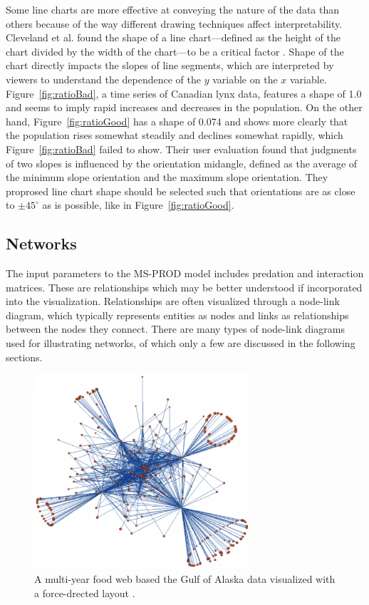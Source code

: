 Some line charts are more effective at conveying the nature of the data than others because of the way different drawing techniques affect interpretability.  Cleveland et al. found the shape of a line chart---defined as the height of the chart divided by the width of the chart---to be a critical factor \cite{cleveland1988}.   Shape of the chart directly impacts the slopes of line segments, which are interpreted by viewers to understand the dependence of the $y$ variable on the $x$ variable.  Figure~\ref{fig:ratioBad}, a time series of Canadian lynx data, features a shape of 1.0 and seems to imply rapid increases and decreases in the population.  On the other hand, Figure~\ref{fig:ratioGood} has a shape of 0.074 and shows more clearly that the population rises somewhat steadily and declines somewhat rapidly, which Figure~\ref{fig:ratioBad} failed to show.  Their user evaluation found that judgments of two slopes is influenced by the orientation midangle, defined as the average of the minimum slope orientation and the maximum slope orientation.  They proprosed line chart shape should be selected such that orientations are as close to $\pm 45 ^{\circ}$ as is possible, like in Figure~\ref{fig:ratioGood}.



\subsection{Networks}

The input parameters to the MS-PROD model includes predation and interaction matrices.  These are relationships which may be better understood if incorporated into the visualization. Relationships are often visualized through a node-link diagram, which typically represents entities as nodes and links as relationships between the nodes they connect.  There are many types of node-link diagrams used for illustrating networks, of which only a few are discussed in the following sections.

\begin{figure}[h]
	\centering
	\includegraphics[width=8cm]{figures/eps/gaichas.eps}
	\caption{A multi-year food web based the Gulf of Alaska data visualized with a force-drected layout \cite{gaichas2008}.}
	\label{fig:gaichas}
\end{figure}

